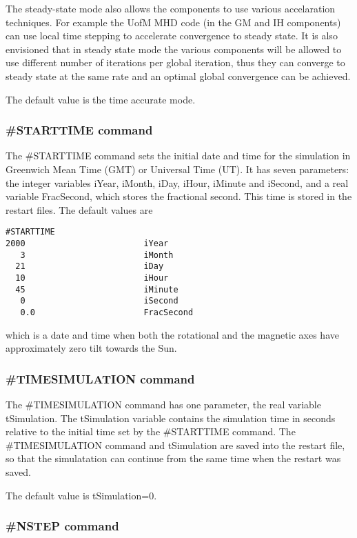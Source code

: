 The steady-state mode also allows the components to use various
accelaration techniques. For example the UofM MHD code (in the GM and IH
components) can use local time stepping to accelerate convergence
to steady state. It is also envisioned that in steady state mode
the various components will be allowed to use different number 
of iterations per global iteration, thus they can converge to steady state 
at the same rate and an optimal global convergence can be achieved.

The default value is the time accurate mode.

\subsubsection{\#STARTTIME command}

The \#STARTTIME command sets the initial date and time for the
simulation in Greenwich Mean Time (GMT) or Universal Time (UT). 
It has seven parameters: the integer variables 
iYear, iMonth, iDay, iHour, iMinute and iSecond, and a real variable 
FracSecond, which stores the fractional second. This time is stored in the 
restart files. The default values are 
\begin{verbatim}
#STARTTIME
2000                        iYear
   3                        iMonth
  21                        iDay
  10                        iHour
  45                        iMinute
   0                        iSecond
   0.0                      FracSecond
\end{verbatim}
which is a date and time when both the rotational and the magnetic axes 
have approximately zero tilt towards the Sun.

\subsubsection{\#TIMESIMULATION command}

The \#TIMESIMULATION command has one parameter, the real variable
tSimulation. The tSimulation variable contains the simulation time in seconds
relative to the initial time set by the \#STARTTIME command. 
The \#TIMESIMULATION command and tSimulation are saved into the restart
file, so that the simulatation can continue from the same time when
the restart was saved.

The default value is tSimulation=0. 

\subsubsection{\#NSTEP command}

